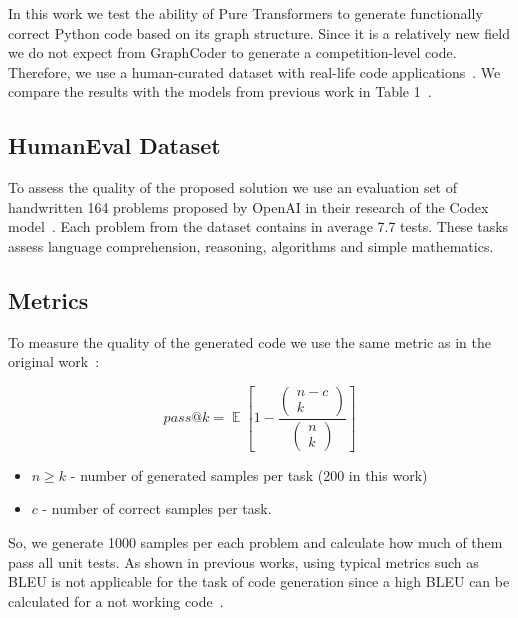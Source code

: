 \documentclass[sigplan,screen,anonymous,natbib=false]{acmart}
\begin{document}
In this work we test the ability of Pure Transformers to generate functionally correct Python code based on its graph structure. 
Since it is a relatively new field we do not expect from GraphCoder to generate a competition-level code. 
Therefore, we use a human-curated dataset with real-life code applications~\cite{chen_evaluating_2021}.
We compare the results with the models from previous work in Table 1~\cite{hendrycks_measuring_2021,chen_evaluating_2021,li_competition-level_nodate,nijkamp_conversational_2022}.

\subsection{HumanEval Dataset}\label{subsec:humaneval-dataset}

To assess the quality of the proposed solution we use an evaluation set of handwritten 164 problems proposed by OpenAI in their research of the Codex model~\cite{chen_evaluating_2021}.
Each problem from the dataset contains in average 7.7 tests. 
These tasks assess language comprehension, reasoning, algorithms and simple mathematics.

\subsection{Metrics}\label{subsec:metrics}

To measure the quality of the generated code we use the same metric as in the original work~\cite{chen_evaluating_2021}:

\[ pass@k = \mathop{\mathbb{E}} \left[1 - \frac{\begin{pmatrix} n-c \\ k \end{pmatrix}}{\begin{pmatrix} n \\ k \end{pmatrix}}\right] \]

\begin{itemize}
    \item $n \geq k$ - number of generated samples per task (200 in this work)
    \item $c$ - number of correct samples per task.
\end{itemize}

So, we generate 1000 samples per each problem and calculate how much of them pass all unit tests.
As shown in previous works, using typical metrics such as BLEU is not applicable for the task of code generation since a high BLEU can be calculated for a not working code~\cite{hendrycks_measuring_2021,chen_evaluating_2021}.
\end{document}
